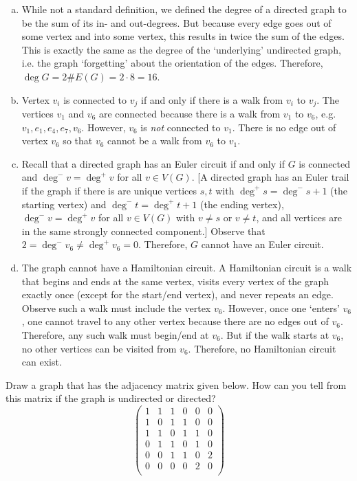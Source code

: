 \documentclass[11pt,letterpaper]{article}
\begin{document}
\begin{enumerate}[(a)]
\item While not a standard definition, we defined the degree of a directed graph to be the sum of its in- and out-degrees. But because every edge goes out of some vertex and into some vertex, this results in twice the sum of the edges. This is exactly the same as the degree of the `underlying' undirected graph, i.e. the graph `forgetting' about the orientation of the edges. Therefore, $\deg G= 2 \#E(G)= 2 \cdot 8= 16$. 

\item Vertex $v_i$ is connected to $v_j$ if and only if there is a walk from $v_i$ to $v_j$. The vertices $v_1$ and $v_6$ are connected because there is a walk from $v_1$ to $v_6$, e.g. $v_1, e_1, e_4, e_7, v_6$. However, $v_6$ is \textit{not} connected to $v_1$. There is no edge out of vertex $v_6$ so that $v_6$ cannot be a walk from $v_6$ to $v_1$. 
 
\item Recall that a directed graph has an Euler circuit if and only if $G$ is connected and $\deg^- v= \deg^+ v$ for all $v \in V(G)$. [A directed graph has an Euler trail if the graph if there is are unique vertices $s, t$ with $\deg^+ s= \deg^- s + 1$ (the starting vertex) and $\deg^- t= \deg^+ t + 1$ (the ending vertex), $\deg^- v= \deg^+ v$ for all $v \in V(G)$ with $v \neq s$ or $v \neq t$, and all vertices are in the same strongly connected component.] Observe that $2= \deg^- v_6 \neq \deg^+ v_6= 0$. Therefore, $G$ cannot have an Euler circuit. 

\item The graph cannot have a Hamiltonian circuit. A Hamiltonian circuit is a walk that begins and ends at the same vertex, visits every vertex of the graph exactly once (except for the start/end vertex), and never repeats an edge. Observe such a walk must include the vertex $v_6$. However, once one `enters' $v_6$, one cannot travel to any other vertex because there are no edges out of $v_6$. Therefore, any such walk must begin/end at $v_6$. But if the walk starts at $v_6$, no other vertices can be visited from $v_6$. Therefore, no Hamiltonian circuit can exist. 
\end{enumerate}



\newpage



 Draw a graph that has the adjacency matrix given below. How can you tell from this matrix if the graph is undirected or directed? 
	\[
	\begin{pmatrix}
	1 & 1 & 1 & 0 & 0 & 0 \\
	1 & 0 & 1 & 1 & 0 & 0 \\
	1 & 1 & 0 & 1 & 1 & 0 \\
	0 & 1 & 1 & 0 & 1 & 0 \\
	0 & 0 & 1 & 1 & 0 & 2 \\
	0 & 0 & 0 & 0 & 2 & 0 \\
	\end{pmatrix}
	\] \pspace
\end{document}
